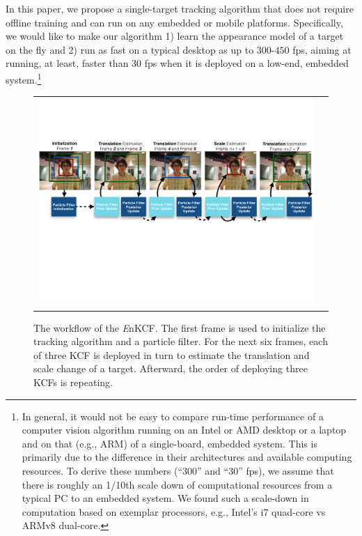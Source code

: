 \documentclass[10pt,twocolumn,letterpaper]{article}
\begin{document}
In this paper, we propose a single-target tracking algorithm that does
not require offline training and can run on any embedded or mobile
platforms. Specifically, we would like to make our algorithm 1) learn
the appearance model of a target on the fly and 2) run as fast on a
typical desktop as up to $300$-$450$ fps, aiming at running, at least,
faster than 30 fps when it is deployed on a low-end, embedded
system.\footnote{In general, it would not be easy to compare run-time
  performance of a computer vision algorithm running on an Intel or
  AMD desktop or a laptop and on that (e.g., ARM) of a single-board,
  embedded system. This is primarily due to the difference in their
  architectures and available computing resources. To derive these
  numbers (``300'' and ``30'' fps), we assume that there is roughly an
  1/10th scale down of computational resources from a typical PC to an
  embedded system. We found such a scale-down in computation based on
  exemplar processors, e.g., Intel's i7 quad-core vs ARMv8 dual-core.}

\begin{figure}[!h]
\centering
\begin{tabular}{cc}
\includegraphics[width=14.00cm]{./figures/Workflow_MKCF+PF.pdf}\\
\end{tabular}
\caption{The workflow of the {\it E}nKCF. The first frame is used to
  initialize the tracking algorithm and a particle filter. For the
  next six frames, each of three KCF is deployed in turn to estimate
  the translation and scale change of a target. Afterward, the order
  of deploying three KCFs is repeating.}
\label{Workflows}
\end{figure}
\end{document}
